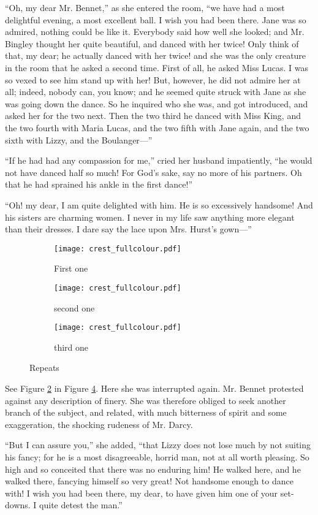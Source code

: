       “Oh, my dear Mr. Bennet,” as she entered the room, “we have had a
      most delightful evening, a most excellent ball. I wish you had
      been there. Jane was so admired, nothing could be like it.
      Everybody said how well she looked; and Mr. Bingley thought her
      quite beautiful, and danced with her twice! Only think of that,
      my dear; he actually danced with her twice! and she was the only
      creature in the room that he asked a second time. First of all,
      he asked Miss Lucas. I was so vexed to see him stand up with her!
      But, however, he did not admire her at all; indeed, nobody can,
      you know; and he seemed quite struck with Jane as she was going
      down the dance. So he inquired who she was, and got introduced,
      and asked her for the two next. Then the two third he danced with
      Miss King, and the two fourth with Maria Lucas, and the two fifth
      with Jane again, and the two sixth with Lizzy, and the
      Boulanger—”

      “If he had had any compassion for me,” cried her husband
      impatiently, “he would not have danced half so much! For God’s
      sake, say no more of his partners. Oh that he had sprained his
      ankle in the first dance!”

      “Oh! my dear, I am quite delighted with him. He is so excessively
      handsome! And his sisters are charming women. I never in my life
      saw anything more elegant than their dresses. I dare say the lace
      upon Mrs. Hurst’s gown—”
\begin{figure}[h]
	\centering
	\begin{subfigure}[b]{0.3\textwidth}
		\centering
		\texttt{[image: crest\_fullcolour.pdf]}
		\caption{First one}
		\label{plot_example_graph_first}	
	\end{subfigure}
	\hfill
	\begin{subfigure}[b]{0.3\textwidth}
		\centering
		\texttt{[image: crest\_fullcolour.pdf]}
		\caption{second one}
		\label{plot_example_graph_second}	
	\end{subfigure}
	\hfill
	\begin{subfigure}[b]{0.3\textwidth}
		\centering
		\texttt{[image: crest\_fullcolour.pdf]}
		\caption{third one}
		\label{plot_example_graph_third}	
	\end{subfigure}
	\caption{Repeats}
	\label{plot_subfigures}
\end{figure}
	See Figure \ref{plot_example_graph_second} in Figure \ref{plot_subfigures}.
      Here she was interrupted again. Mr. Bennet protested against any
      description of finery. She was therefore obliged to seek another
      branch of the subject, and related, with much bitterness of
      spirit and some exaggeration, the shocking rudeness of Mr. Darcy.

      “But I can assure you,” she added, “that Lizzy does not lose much
      by not suiting his fancy; for he is a most disagreeable, horrid
      man, not at all worth pleasing. So high and so conceited that
      there was no enduring him! He walked here, and he walked there,
      fancying himself so very great! Not handsome enough to dance
      with! I wish you had been there, my dear, to have given him one
      of your set-downs. I quite detest the man.”